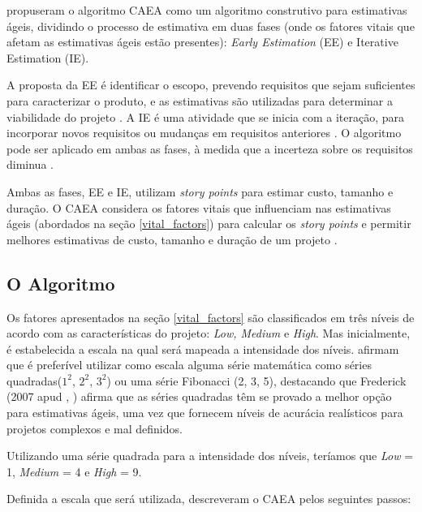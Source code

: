 
 propuseram o algoritmo CAEA como um algoritmo construtivo para estimativas ágeis,
dividindo o processo de estimativa em duas fases (onde os fatores vitais que afetam as estimativas ágeis
estão presentes): \textit{Early Estimation} (EE) e {Iterative Estimation} (IE).

A proposta da EE é identificar o escopo, prevendo requisitos que sejam suficientes para caracterizar o produto,
e as estimativas são utilizadas para determinar a viabilidade do projeto \cite{bhalerao09}.
A IE é uma atividade que se inicia com a iteração, para incorporar novos requisitos ou mudanças
em requisitos anteriores \cite{bhalerao09}.
O algoritmo pode ser aplicado em ambas as fases, à medida que a incerteza sobre os requisitos diminua \cite{bhalerao09}.

Ambas as fases, EE e IE, utilizam \textit{story points} para estimar custo, tamanho e duração. O CAEA considera os fatores
vitais que influenciam nas estimativas ágeis (abordados na seção \ref{vital_factors}) para calcular os \textit{story points}
e permitir melhores estimativas de custo, tamanho e duração de um projeto \cite{bhalerao09}.

  \subsection*{O Algoritmo}
  \label{algoritmo}
    
    Os fatores apresentados na seção \ref{vital_factors} são classificados em três 
    níveis de acordo com as características do projeto: \textit{Low, Medium} e \textit{High}.
    Mas inicialmente, é estabelecida a escala na qual será mapeada a intensidade dos níveis.
     afirmam que é preferível utilizar como escala alguma série matemática como séries
    quadradas($1^2$, $2^2$, $3^2$) ou uma série Fibonacci (2, 3, 5), destacando que Frederick (2007 apud \citeauthor{bhalerao09}, \citeyear{bhalerao09})
    afirma que as séries quadradas têm se provado a melhor opção para estimativas ágeis, uma vez que fornecem níveis de acurácia 
    realísticos para projetos complexos e mal definidos.
    
    Utilizando uma série quadrada para a intensidade dos níveis,
    teríamos que \textit{Low} = 1, \textit{Medium} = 4 e \textit{High} = 9.
    
    Definida a escala que será utilizada,  descreveram o CAEA pelos seguintes passos:
    
